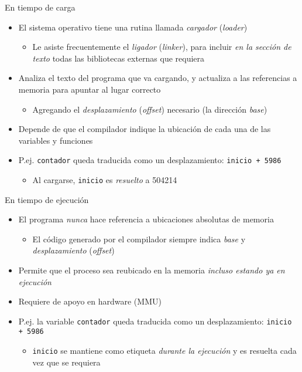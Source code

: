 \documentclass[presentation]{beamer}
\begin{document}
\begin{frame}[label={sec:org7db8639},fragile]{En tiempo de carga}
 \begin{itemize}
\item El sistema operativo tiene una rutina llamada \emph{cargador} (\emph{loader})
\begin{itemize}
\item Le asiste frecuentemente el \emph{ligador} (\emph{linker}), para incluir \emph{en
la sección de texto} todas las bibliotecas externas que requiera
\end{itemize}
\item Analiza el texto del programa que va cargando, y actualiza a las
referencias a memoria para apuntar al lugar correcto
\begin{itemize}
\item Agregando el \emph{desplazamiento} (\emph{offset}) necesario (la dirección
\emph{base})
\end{itemize}
\item Depende de que el compilador indique la ubicación de cada una de
las variables y funciones
\item P.ej. \texttt{contador} queda traducida como un desplazamiento: \texttt{inicio +
  5986}
\begin{itemize}
\item Al cargarse, \texttt{inicio} es \emph{resuelto} a 504214
\end{itemize}
\end{itemize}
\end{frame}

\begin{frame}[label={sec:org6e456f5},fragile]{En tiempo de ejecución}
 \begin{itemize}
\item El programa \emph{nunca} hace referencia a ubicaciones absolutas de
memoria
\begin{itemize}
\item El código generado por el compilador siempre indica \emph{base} y
\emph{desplazamiento} (\emph{offset})
\end{itemize}
\item Permite que el proceso sea reubicado en la memoria \emph{incluso estando
ya en ejecución}
\item Requiere de apoyo en hardware (MMU)
\item P.ej. la variable \texttt{contador} queda traducida como un desplazamiento:
\texttt{inicio + 5986}
\begin{itemize}
\item \texttt{inicio} se mantiene como etiqueta \emph{durante la ejecución} y es
resuelta cada vez que se requiera
\end{itemize}
\end{itemize}
\end{frame}
\end{document}
